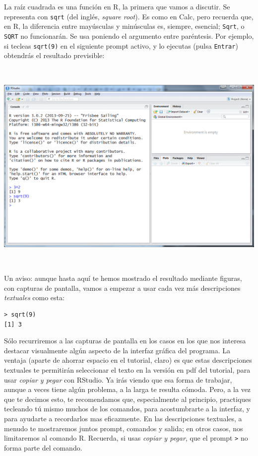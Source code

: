 \documentclass[10pt,a4paper]{article}\usepackage[]{graphicx}\usepackage[]{color}
\begin{document}
La raíz cuadrada es una {\sf función} en R, la primera que vamos a  discutir. Se representa con {\tt sqrt} (del inglés, {\em square root}). Es como en Calc, pero recuerda que, en R, la diferencia entre mayúsculas y minúsculas es, siempre, esencial; {\tt Sqrt}, o {\tt SQRT} no funcionarán. Se usa poniendo el {\sf argumento} entre paréntesis. Por ejemplo, si tecleas
{\tt sqrt(9)}
en el siguiente prompt activo, y lo ejecutas (pulsa {\tt Entrar})
obtendrás el resultado previsible:
    \begin{center}
    \includegraphics[height=10.5cm]{../fig/Tut02-03.png}
    \end{center}
Un aviso: aunque hasta aquí te hemos mostrado el resultado mediante figuras, con capturas de pantalla, vamos a empezar a usar cada vez más descripciones {\em textuales} como esta:
\begin{verbatim}
> sqrt(9)
[1] 3
\end{verbatim}
Sólo recurriremos a las capturas de pantalla en los casos en los que nos interesa destacar visualmente algún aspecto de la interfaz gráfica del programa. La ventaja (aparte de ahorrar espacio en el tutorial, claro) es que estas descripciones textuales te permitirán seleccionar el texto en la versión en pdf del tutorial, para usar {\em copiar y pegar} con RStudio. Ya irás viendo que esa forma de trabajar, aunque a veces tiene algún problema, a la larga te resulta cómoda. Pero, a la vez que te decimos esto, te recomendamos que, especialmente al principio, practiques tecleando tú mismo muchos de los comandos, para acostumbrarte a la interfaz, y para ayudarte a recordarlos mas eficazmente.  En las descripciones textuales, a menudo te mostraremos juntos prompt, comandos y salida; en otros casos, nos limitaremos al comando R. Recuerda, si usas {\em copiar y pegar}, que el prompt \verb#># no forma parte del comando.
\end{document}
